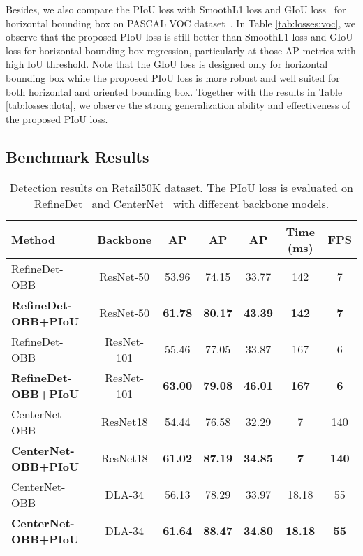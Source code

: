  Besides, we also compare the PIoU loss with SmoothL1 loss and GIoU loss~\cite{Rezatofighi2019GIO} for horizontal bounding box on PASCAL VOC dataset~\cite{Everingham2015TPV}. In Table \ref{tab:losses:voc}, we observe that the proposed PIoU loss is still better than SmoothL1 loss and GIoU loss for horizontal bounding box regression, particularly at those AP metrics with high IoU threshold. Note that the GIoU loss is designed only for horizontal bounding box while the proposed PIoU loss is more robust and well suited for both horizontal and oriented bounding box. Together with the results in Table \ref{tab:losses:dota}, we observe the strong generalization ability and effectiveness of the proposed PIoU loss.

\subsection{Benchmark Results}
\begin{table}[t]
\footnotesize
\centering
\setlength{\tabcolsep}{3pt}
\caption{Detection results on Retail50K dataset. The PIoU loss is evaluated on RefineDet~\cite{refinedet} and CenterNet~\cite{Zhou2019OAP} with different backbone models.}
\vspace{-2mm}
\begin{tabular}{lcccccc}
\hline
Method               & Backbone    & AP    & AP & AP & Time (ms) & FPS  \\ \hline
RefineDet-OBB~\cite{refinedet}     & ResNet-50 & 53.96 & 74.15 & 33.77 & 142 & 7  \\
\textbf{RefineDet-OBB+PIoU} & ResNet-50 & \textbf{61.78} & \textbf{80.17} & \textbf{43.39} & \textbf{142} & \textbf{7}   \\
RefineDet-OBB~\cite{refinedet} & ResNet-101      & 55.46 & 77.05 & 33.87 & 167 & 6   \\
\textbf{RefineDet-OBB+PIoU} & ResNet-101 & \textbf{63.00} & \textbf{79.08} & \textbf{46.01} & \textbf{167} & \textbf{6}   \\ \hline
CenterNet-OBB~\cite{Zhou2019OAP} & ResNet18      & 54.44 & 76.58  & 32.29  & 7 & 140 \\
\textbf{CenterNet-OBB+PIoU} & ResNet18 & \textbf{61.02} & \textbf{87.19}  & \textbf{34.85}  & \textbf{7} & \textbf{140} \\
CenterNet-OBB~\cite{Zhou2019OAP} & DLA-34      & 56.13 & 78.29  & 33.97  & 18.18 & 55 \\
\textbf{CenterNet-OBB+PIoU} & DLA-34 & \textbf{61.64} & \textbf{88.47}  & \textbf{34.80}  & \textbf{18.18} & \textbf{55} \\\hline
\end{tabular}
\label{tab:exp:eval:potential}
\end{table}
